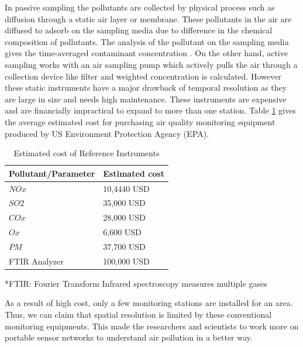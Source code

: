 \par

In passive sampling the pollutants are collected by physical process such as diffusion through a static air layer or membrane. These pollutants in the air are diffused to adsorb on the sampling media due to difference in the chemical composition of pollutants. The analysis of the pollutant on the sampling media gives the time-averaged contaminant concentration \cite{Environment2009}. On the other hand, active sampling works with an air sampling pump which actively pulls the air through a collection device like filter  and weighted concentration is calculated. However these static instruments have a major drawback of temporal resolution as they are large in size and needs high maintenance. These instruments are expensive and are financially impractical to expand to more than one station. Table \ref{table:cost} gives the average estimated cost for purchasing air quality monitoring equipment produced by US Environment Protection Agency (EPA). 

\begin{table}[h]
  
  
    \begin{tabularx}{\columnwidth}{X|X}
        \hline
        Pollutant/Parameter           & Estimated cost    \\
        \hline
    
      $NOx$   & 10,4440         USD \\ 
      $SO2$   & 35,000          USD \\ 
      $COx$   & 28,000          USD\\ 
      $Ox$   & 6,600            USD\\ 
      $PM$   & 37,700           USD\\ 
     
      FTIR Analyzer   & 100,000 USD\\ \hline
     
        
      
  \end{tabularx}
  *FTIR: Fourier Transform Infrared spectroscopy measures multiple gases 
    \caption{Estimated cost of Reference Instruments\cite{Mussatti2000}}
    \label{table:cost}
  \end{table}


As a result of high cost, only a few monitoring stations are installed for an area. Thus, we can claim that spatial resolution is limited by these conventional monitoring equipments. This made the researchers and scientists to work more on portable sensor networks to understand air pollution in a better way.


